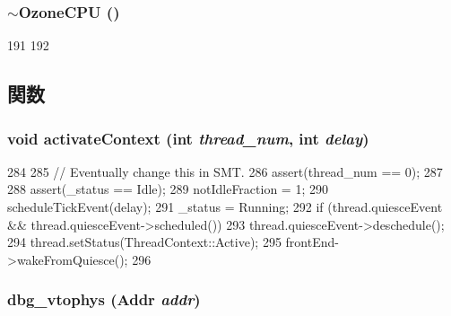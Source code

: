 \hypertarget{classOzoneCPU_a10f4512b7ceb84d889fc0057ecd2df6a}{
\subsubsection[{$\sim$OzoneCPU}]{\setlength{\rightskip}{0pt plus 5cm}$\sim${\bf OzoneCPU} ()}}
\label{classOzoneCPU_a10f4512b7ceb84d889fc0057ecd2df6a}



\begin{DoxyCode}
191 {
192 }
\end{DoxyCode}


\subsection{関数}
\hypertarget{classOzoneCPU_a1fc25b2b1267600be79d406c2da0f465}{
\subsubsection[{activateContext}]{\setlength{\rightskip}{0pt plus 5cm}void activateContext (int {\em thread\_\-num}, \/  int {\em delay})}}
\label{classOzoneCPU_a1fc25b2b1267600be79d406c2da0f465}



\begin{DoxyCode}
284 {
285     // Eventually change this in SMT.
286     assert(thread_num == 0);
287 
288     assert(_status == Idle);
289     notIdleFraction = 1;
290     scheduleTickEvent(delay);
291     _status = Running;
292     if (thread.quiesceEvent && thread.quiesceEvent->scheduled())
293         thread.quiesceEvent->deschedule();
294     thread.setStatus(ThreadContext::Active);
295     frontEnd->wakeFromQuiesce();
296 }
\end{DoxyCode}
\hypertarget{classOzoneCPU_a7e2d118d430dcbebd896ba39811ef03b}{
\subsubsection[{dbg\_\-vtophys}]{ dbg\_\-vtophys ({\bf Addr} {\em addr})}}
\label{classOzoneCPU_a7e2d118d430dcbebd896ba39811ef03b}



